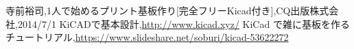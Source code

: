 \begin{thebibliography}{8}
寺前裕司,1人で始めるプリント基板作り[完全フリーKicad付き],CQ出版株式会社,2014/7/1
 KiCADで基本設計,\url{http://www.kicad.xyz/}
 KiCad で雑に基板を作る チュートリアル,\url{https://www.slideshare.net/soburi/kicad-53622272}
\end{thebibliography}



